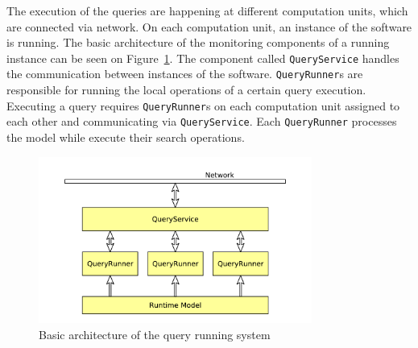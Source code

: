 The execution of the queries are happening at different computation units, which are connected via network.
On each computation unit, an instance of the software is running.
The basic architecture of the monitoring components of a running instance can be seen on Figure~\ref{fig:query-runner-architecture}. 
The component called \texttt{QueryService} handles the communication between instances of the software.
\texttt{QueryRunner}s are responsible for running the local operations of a certain query execution. Executing a query requires \texttt{QueryRunner}s on each computation unit assigned to each other and communicating via \texttt{QueryService}. 
Each \texttt{QueryRunner} processes the model while execute their search operations.

\begin{figure}[H]
	\begin{center}
		\includegraphics[width=0.8\textwidth]{figures/query-runner-architecture.pdf}
		\caption{ Basic architecture of the query running system }
		\label{fig:query-runner-architecture}
	\end{center}
\end{figure}



